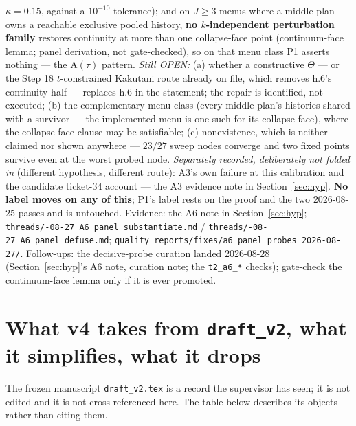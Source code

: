 \documentclass[11pt,a4paper]{article}
\newcommand{\Atau}{\mathrm{A}(\tau)}
\begin{document}
\begin{enumerate}
  $\kappa=0.15$, against a $10^{-10}$ tolerance); and on $J\ge3$ menus where a middle plan
  owns a reachable exclusive pooled history, \textbf{no $k$-independent perturbation
  family} restores continuity at more than one collapse-face point (continuum-face lemma;
  panel derivation, not gate-checked), so on that menu class P1 asserts nothing --- the
  $\Atau$ pattern. \emph{Still OPEN:} (a) whether a constructive $\Theta$ --- or the
  Step 18 $t$-constrained Kakutani route already on file, which removes h.6's continuity
  half --- replaces h.6 in the statement; the repair is identified, not executed; (b) the
  complementary menu class (every middle plan's histories shared with a survivor --- the
  implemented menu is one such for its collapse face), where the collapse-face clause may
  be satisfiable; (c) nonexistence, which is neither claimed nor shown anywhere ---
  $23/27$ sweep nodes converge and two fixed points survive even at the worst probed node.
  \emph{Separately recorded, deliberately not folded in} (different hypothesis, different
  route): A3's own failure at this calibration and the candidate ticket-34 account --- the
  A3 evidence note in Section~\ref{sec:hyp}. \textbf{No label moves on any of this}; P1's
  label rests on the proof and the two 2026-08-25 passes and is untouched. Evidence: the
  A6 note in Section~\ref{sec:hyp};
  \texttt{threads/-08-27\_A6\_panel\_substantiate.md} /
  \texttt{threads/-08-27\_A6\_panel\_defuse.md};
  \texttt{quality\_reports/\allowbreak fixes/\allowbreak a6\_panel\_probes\_2026-08-27/}.
  Follow-ups: the decisive-probe curation landed 2026-08-28
  (Section~\ref{sec:hyp}'s A6 note, curation note; the \texttt{t2\_a6\_*} checks);
  gate-check the continuum-face lemma only if it is ever promoted.
\end{enumerate}

\section{What v4 takes from \texttt{draft\_v2}, what it simplifies, what it drops}

The frozen manuscript \texttt{draft\_v2.tex} is a record the supervisor has seen; it
is not edited and it is not cross-referenced here. The table below describes its
objects rather than citing them.
\end{document}
